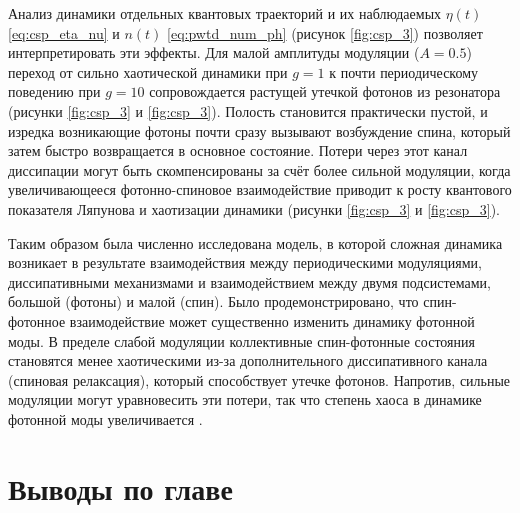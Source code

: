 Анализ динамики отдельных квантовых траекторий и их наблюдаемых $\eta(t)$ \cref{eq:csp_eta_nu} и $n(t)$ \cref{eq:pwtd_num_ph} (рисунок \cref{fig:csp_3}) позволяет интерпретировать эти эффекты.
Для малой амплитуды модуляции ($A = 0.5$) переход от сильно хаотической динамики при $g=1$ к почти периодическому поведению при $g=10$ сопровождается растущей утечкой фотонов из резонатора (рисунки \cref{fig:csp_3} и \cref{fig:csp_3}). 
Полость становится практически пустой, и изредка возникающие фотоны почти сразу вызывают возбуждение спина, который затем быстро возвращается в основное состояние. 
Потери через этот канал диссипации могут быть скомпенсированы за счёт более сильной модуляции, когда увеличивающееся фотонно-спиновое взаимодействие приводит к росту квантового показателя Ляпунова и хаотизации динамики (рисунки \cref{fig:csp_3} и \cref{fig:csp_3}).

Таким образом была численно исследована модель, в которой сложная динамика возникает в результате взаимодействия между периодическими модуляциями, диссипативными механизмами и взаимодействием между двумя подсистемами, большой (фотоны) и малой (спин). 
Было продемонстрировано, что спин-фотонное взаимодействие может существенно изменить динамику фотонной моды. 
В пределе слабой модуляции коллективные спин-фотонные состояния становятся менее хаотическими из-за дополнительного диссипативного канала (спиновая релаксация), который способствует утечке фотонов. 
Напротив, сильные модуляции могут уравновесить эти потери, так что степень хаоса в динамике фотонной моды увеличивается \cite{Yusipov2021}. 

\section{Выводы по главе}\label{sec:ch3/results}

